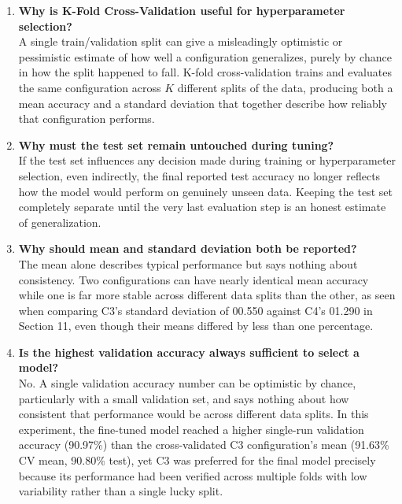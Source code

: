 \documentclass[10pt]{article}
\begin{document}
\begin{enumerate}
\item \textbf{Why is K-Fold Cross-Validation useful for hyperparameter selection?}\\
A single train/validation split can give a misleadingly optimistic or
pessimistic estimate of how well a configuration generalizes, purely by
chance in how the split happened to fall. K-fold cross-validation
trains and evaluates the same configuration across $K$ different splits
of the data, producing both a mean accuracy and a standard deviation
that together describe how reliably that configuration performs.\\

\item \textbf{Why must the test set remain untouched during tuning?}\\
If the test set influences any decision made during training or
hyperparameter selection, even indirectly, the final reported test
accuracy no longer reflects how the model would perform on genuinely unseen data. Keeping the test set completely separate until the very last evaluation step is an honest estimate of generalization.\\

\item \textbf{Why should mean and standard deviation both be reported?}\\
The mean alone describes typical performance but says nothing about
consistency. Two configurations can have nearly identical mean accuracy while one is far more stable across different data splits than the other, as seen when comparing C3's standard deviation of 00.550 against C4's 01.290 in Section 11, even though their means differed by less than one percentage.\\

\item \textbf{Is the highest validation accuracy always sufficient to select a model?}\\
No. A single validation accuracy number can be optimistic by chance,
particularly with a small validation set, and says nothing about how
consistent that performance would be across different data splits. In
this experiment, the fine-tuned model reached a higher single-run
validation accuracy (90.97\%) than the cross-validated C3 configuration's mean (91.63\% CV mean, 90.80\% test), yet C3 was preferred for the final model precisely because its performance had been verified across multiple folds with low variability rather than a single lucky split.\\

\end{enumerate}
\end{document}
